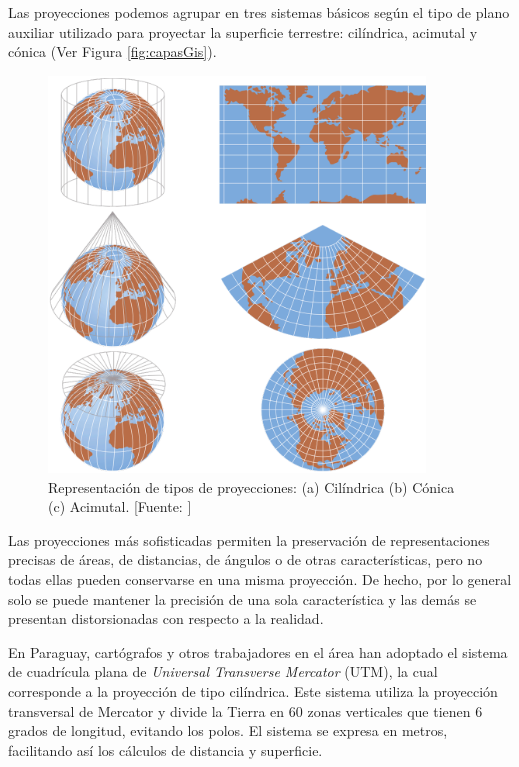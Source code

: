 
Las proyecciones podemos agrupar en tres sistemas básicos según el tipo de plano auxiliar utilizado para proyectar la superficie terrestre: cilíndrica, acimutal y cónica (Ver Figura \ref{fig:capasGis}).

\begin{figure}[H]
    \centering
    \includegraphics[width=10cm]{Chapter3/Chapter3Figs/CoordenadasProyectadas.png}
    \caption{Representación de tipos de proyecciones: (a) Cilíndrica (b) Cónica (c) Acimutal. [Fuente: ]}
    \label{fig:mapaCoordenadasGeograficas}
\end{figure}

Las proyecciones más sofisticadas permiten la preservación de representaciones precisas de áreas, de distancias, de ángulos o de otras características, pero no todas ellas pueden conservarse en una misma proyección. De hecho, por lo general solo se puede mantener la  precisión de una sola característica y las demás se presentan distorsionadas con respecto a la realidad.

En Paraguay, cartógrafos y otros trabajadores en el área han adoptado el sistema de cuadrícula plana de \textit{Universal Transverse Mercator} (UTM), la cual corresponde a la proyección de tipo cilíndrica. Este sistema utiliza la proyección transversal de Mercator y divide la Tierra en 60 zonas verticales que tienen 6 grados de longitud, evitando los polos. El sistema se expresa en metros, facilitando así los cálculos de distancia y superficie.

